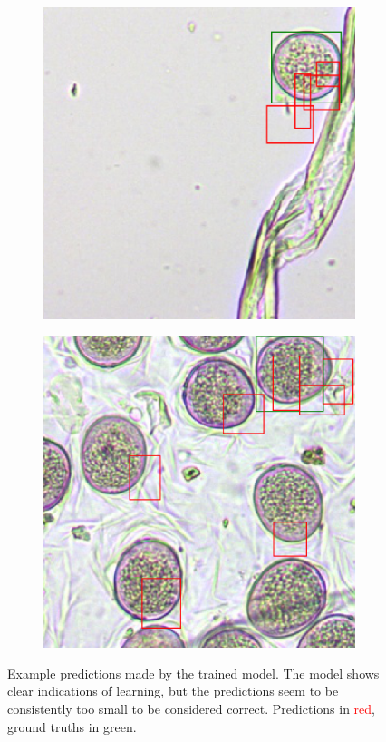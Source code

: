 \begin{figure}[htbp]
  \centering
  \begin{subfigure}[t]{0.4\textwidth}
    \centering
    \includegraphics[width=\textwidth]{figs/infer_01}
  \end{subfigure}%
  \hspace*{0.04\textwidth}
  \begin{subfigure}[t]{0.4\textwidth}
    \centering
    \includegraphics[width=\textwidth]{figs/infer_02}
  \end{subfigure}
  \caption[Example predictions]{Example predictions made by the trained model.
The model shows clear indications of learning, but the predictions seem to be consistently too small to be considered correct.
Predictions in \textcolor{red}{red}, ground truths in \textcolor{nicegreen}{green}.}\label{fig:pred}
\end{figure}

